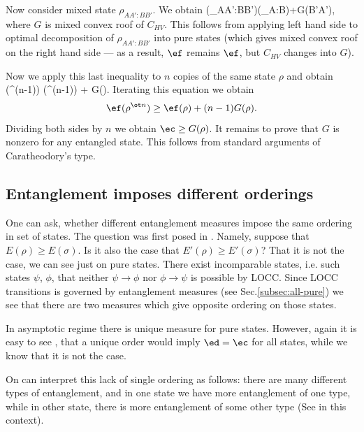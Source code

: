 \documentclass[rmp,12pt,preprint]{revtex4-2}
\begin{document}
Now consider mixed state $\rho_{AA':BB'}$. We obtain \be
\ef(\rho_{AA':BB'})\geq \ef(\rho_{A:B})+G(B'\>A'), \ee where $G$ is
mixed convex roof of $C_{HV}$. This follows from applying left hand
side to optimal decomposition of $\rho_{AA':BB'}$ into pure states
(which gives mixed convex roof on the right hand side --- as a result,
$\ef$ remains $\ef$, but $C_{HV}$ changes into $G$).

Now we apply this last inequality to $n$ copies of the same state
$\rho$ and obtain \be \ef(\rho^{\ot (n-1)}\ot \rho) \geq
\ef(\rho^{\ot (n-1)}) + G(\rho). \ee Iterating this equation we
obtain \begin{equation} \ef(\rho^{\ot n}) \geq \ef(\rho) + (n-1) G(\rho). \end{equation}
Dividing both sides by $n$ we obtain $\ec \geq G(\rho)$. It remains
to prove that $G$ is nonzero for any entangled state. This follows
from standard arguments of Caratheodory's type.

\subsection{Entanglement imposes different orderings}
One can ask, whether different entanglement measures impose the same
ordering in set of states. The question was first posed in
\cite{VirmaniP1999-order}. Namely, suppose that $E(\rho)\geq
E(\sigma)$. Is it also the case that $E'(\rho)\geq E'(\sigma)$?
That it is not the case, we can see just on pure states. There
exist incomparable states, i.e. such states $\psi$, $\phi$, that
neither $\psi\to \phi$ nor $\phi\to\psi$ is possible by LOCC. Since
LOCC transitions is governed by entanglement measures (see
Sec.\ref{subsec:all-pure}) we see that there are two measures which
give opposite ordering on those states.

In asymptotic regime there is unique measure for pure states.
However, again it is easy to see \cite{VirmaniP1999-order}, that a unique order
would imply $\ed=\ec$ for all states, while we know that it is not the case.

On can interpret this lack of single ordering as follows:
there are many different types of entanglement,
and in one state we have more entanglement of one type, while in other state,
there is more entanglement of some other type
(See \cite{Miranowicz,Verstraete} in this context).
\end{document}
